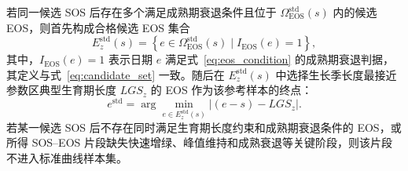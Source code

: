 若同一候选 SOS 后存在多个满足成熟期衰退条件且位于 \(\Omega^{\mathrm{std}}_{\mathrm{EOS}}(s)\) 内的候选 EOS，则首先构成合格候选 EOS 集合
\begin{equation}
    E^{\mathrm{std}}_z(s)=
    \left\{
    e\in\Omega^{\mathrm{std}}_{\mathrm{EOS}}(s)
    \mid
    I_{\mathrm{EOS}}(e)=1
    \right\},
    \label{eq:std_eos_eligible}
\end{equation}
其中，\(I_{\mathrm{EOS}}(e)=1\) 表示日期 \(e\) 满足式~\ref{eq:eos_condition} 的成熟期衰退判据，其定义与式~\ref{eq:candidate_set} 一致。随后在 \(E^{\mathrm{std}}_z(s)\) 中选择生长季长度最接近参数区典型生育期长度 \(LGS_z\) 的 EOS 作为该参考样本的终点：
\begin{equation}
    e^{\mathrm{std}}=
    \arg\min_{e\in E^{\mathrm{std}}_z(s)}
    \left| (e-s)-LGS_z \right|.
    \label{eq:std_eos_selection}
\end{equation}
若某一候选 SOS 后不存在同时满足生育期长度约束和成熟期衰退条件的 EOS，或所得 SOS--EOS 片段缺失快速增绿、峰值维持和成熟衰退等关键阶段，则该片段不进入标准曲线样本集。

